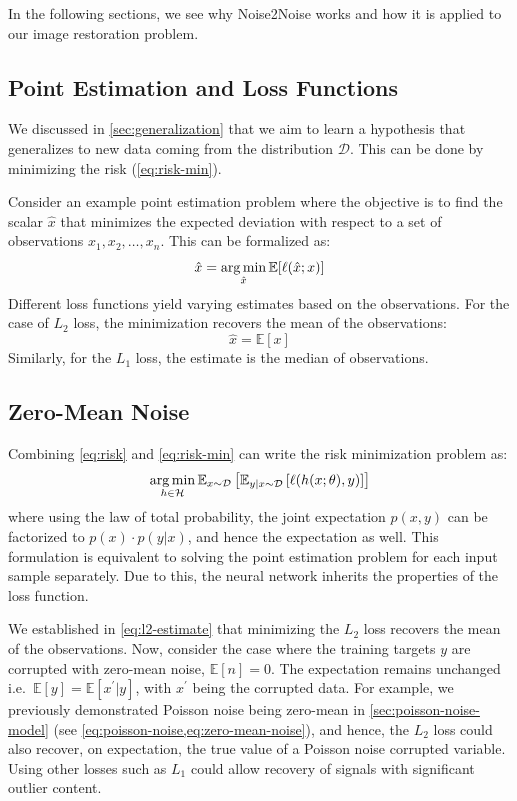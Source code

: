 In the following sections, we see why Noise2Noise works and how it is applied to our image restoration problem.
\subsection{Point Estimation and Loss Functions}
We discussed in \cref{sec:generalization} that we aim to learn a hypothesis that generalizes to new data coming from the distribution $\mathcal{D}$. This can be done by minimizing the risk (\cref{eq:risk-min}). 

Consider an example point estimation problem where the objective is to find the scalar $\hat{x}$ that minimizes the expected deviation with respect to a set of observations $x_1, x_2, \dots, x_n$. This can be formalized as:
\begin{equation}
    \hat{x} = \operatorname*{arg\,min}_{\hat{x}} \mathbb{E}[\ell(\hat{x}; x)]
\end{equation}
Different loss functions yield varying estimates based on the observations. For the case of $L_2$ loss, the minimization recovers the mean of the observations:
\begin{equation}\label{eq:l2-estimate}
    \hat{x} = \mathbb{E}[x]
\end{equation}
Similarly, for the $L_1$ loss, the estimate is the median of observations.

\subsection{Zero-Mean Noise}
Combining \cref{eq:risk} and \cref{eq:risk-min} can write the risk minimization problem as:
\begin{equation}
    \operatorname*{arg\,min}_{h \in \mathcal{H}} \mathbb{E}_{x \sim \mathcal{D}} \left[\mathbb{E}_{y|x \sim \mathcal{D}} \left[ \ell(h(x; \theta), y) \right]\right]
\end{equation}
where using the law of total probability, the joint expectation $p(x,y)$ can be factorized to $p(x) \cdot p(y | x)$, and hence the expectation as well. This formulation is equivalent to solving the point estimation problem for each input sample separately. Due to this, the neural network inherits the properties of the loss function.

We established in \cref{eq:l2-estimate} that minimizing the $L_2$ loss recovers the mean of the observations. Now, consider the case where the training targets $y$ are corrupted with zero-mean noise, $\mathbb{E}[n] = 0$. The expectation remains unchanged i.e.\ $\mathbb{E}[y] = \mathbb{E}[x^\prime|y]$, with $x^\prime$ being the corrupted data. For example, we previously demonstrated Poisson noise being zero-mean  in \cref{sec:poisson-noise-model} (see \cref{eq:poisson-noise,eq:zero-mean-noise}), and hence, the $L_2$ loss could also recover, on expectation, the true value of a Poisson noise corrupted variable. Using other losses such as $L_1$ could allow recovery of signals with significant outlier content.

